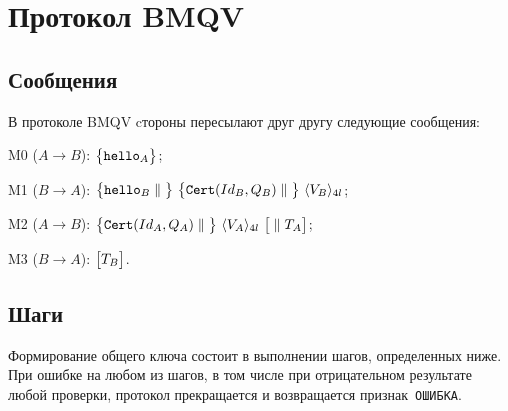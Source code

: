 \section{Протокол BMQV}\label{MQV}

\subsection{Сообщения}\label{MQV.Messages}

В протоколе BMQV
cтороны пересылают друг другу следующие сообщения:

M0 ($A\to B$): 
$\mathbf{\bigl\{}\texttt{hello}_A\mathbf{\bigr\}}$;

M1 ($B\to A$): 
$\mathimplicit{\hello_B\parallel}\ 
\mathimplicit{\Cert(Id_B, Q_B)\parallel}\ 
\langle V_B\rangle_{4l}$;

M2 ($A\to B$): 
$\mathimplicit{\Cert(Id_A,Q_A)\parallel}\ 
\langle V_A\rangle_{4l}\ \mathoptional{\parallel T_A}$;

M3 ($B\to A$): 
$\mathbf{\bigl[}T_B\mathbf{\bigr]}$.

\subsection{Шаги}\label{MQV.Steps}

Формирование общего ключа состоит в выполнении шагов, определенных ниже. При
ошибке на любом из шагов, в том числе при отрицательном результате любой
проверки, протокол прекращается и возвращается признак~\texttt{ОШИБКА}.

